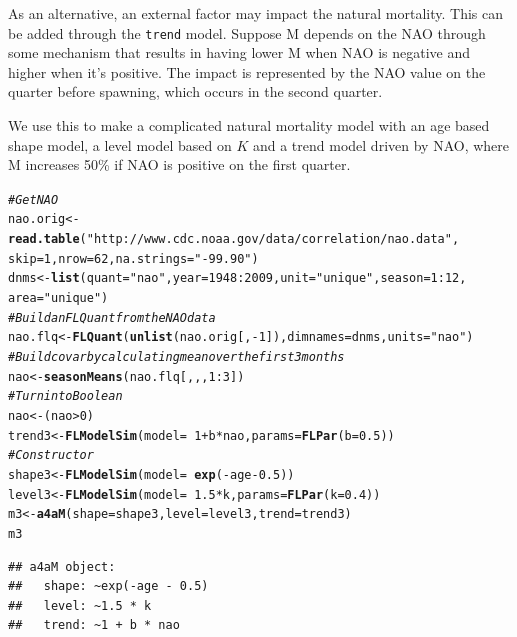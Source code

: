 \documentclass[a4paper,english,10pt]{article}\usepackage[]{graphicx}\usepackage[]{color}
\makeatletter
\newcommand{\hlnum}[1]{\textcolor[rgb]{0.686,0.059,0.569}{#1}}%
\newcommand{\hlstr}[1]{\textcolor[rgb]{0.192,0.494,0.8}{#1}}%
\newcommand{\hlcom}[1]{\textcolor[rgb]{0.678,0.584,0.686}{\textit{#1}}}%
\newcommand{\hlopt}[1]{\textcolor[rgb]{0,0,0}{#1}}%
\newcommand{\hlstd}[1]{\textcolor[rgb]{0.345,0.345,0.345}{#1}}%
\newcommand{\hlkwb}[1]{\textcolor[rgb]{0.69,0.353,0.396}{#1}}%
\newcommand{\hlkwc}[1]{\textcolor[rgb]{0.333,0.667,0.333}{#1}}%
\newcommand{\hlkwd}[1]{\textcolor[rgb]{0.737,0.353,0.396}{\textbf{#1}}}%
\newenvironment{kframe}{%
 \def\at@end@of@kframe{}%
 \ifinner\ifhmode%
  \def\at@end@of@kframe{\end{minipage}}%
  \begin{minipage}{\columnwidth}%
 \fi\fi%
 \def\FrameCommand##1{\hskip\@totalleftmargin \hskip-\fboxsep
 \colorbox{shadecolor}{##1}\hskip-\fboxsep
     \hskip-\linewidth \hskip-\@totalleftmargin \hskip\columnwidth}%
 \MakeFramed {\advance\hsize-\width
   \@totalleftmargin\z@ \linewidth\hsize
   \@setminipage}}%
 {\par\unskip\endMakeFramed%
 \at@end@of@kframe}
\newenvironment{knitrout}{}{} %
\newcommand{\code}[1]{{\texttt{#1}}}
\makeatother
\begin{document}
As an alternative, an external factor may impact the natural mortality. This can be added through the \code{trend} model. Suppose M depends on the NAO through some mechanism that results in having lower M when NAO is negative and higher when it's positive. The impact is represented by the NAO value on the quarter before spawning, which occurs in the second quarter. 

We use this to make a complicated natural mortality model with an age based shape model, a level model based on $K$ and a trend model driven by NAO, where M increases 50\% if NAO is positive on the first quarter.

\begin{knitrout}
\color{fgcolor}\begin{kframe}
\begin{alltt}
\hlcom{# Get NAO}
\hlstd{nao.orig} \hlkwb{<-} \hlkwd{read.table}\hlstd{(}\hlstr{"http://www.cdc.noaa.gov/data/correlation/nao.data"}\hlstd{,}
    \hlkwc{skip} \hlstd{=} \hlnum{1}\hlstd{,} \hlkwc{nrow} \hlstd{=} \hlnum{62}\hlstd{,} \hlkwc{na.strings} \hlstd{=} \hlstr{"-99.90"}\hlstd{)}
\hlstd{dnms} \hlkwb{<-} \hlkwd{list}\hlstd{(}\hlkwc{quant} \hlstd{=} \hlstr{"nao"}\hlstd{,} \hlkwc{year} \hlstd{=} \hlnum{1948}\hlopt{:}\hlnum{2009}\hlstd{,} \hlkwc{unit} \hlstd{=} \hlstr{"unique"}\hlstd{,} \hlkwc{season} \hlstd{=} \hlnum{1}\hlopt{:}\hlnum{12}\hlstd{,}
    \hlkwc{area} \hlstd{=} \hlstr{"unique"}\hlstd{)}
\hlcom{# Build an FLQuant from the NAO data}
\hlstd{nao.flq} \hlkwb{<-} \hlkwd{FLQuant}\hlstd{(}\hlkwd{unlist}\hlstd{(nao.orig[,} \hlopt{-}\hlnum{1}\hlstd{]),} \hlkwc{dimnames} \hlstd{= dnms,} \hlkwc{units} \hlstd{=} \hlstr{"nao"}\hlstd{)}
\hlcom{# Build covar by calculating mean over the first 3 months}
\hlstd{nao} \hlkwb{<-} \hlkwd{seasonMeans}\hlstd{(nao.flq[, , ,} \hlnum{1}\hlopt{:}\hlnum{3}\hlstd{])}
\hlcom{# Turn into Boolean}
\hlstd{nao} \hlkwb{<-} \hlstd{(nao} \hlopt{>} \hlnum{0}\hlstd{)}
\hlstd{trend3} \hlkwb{<-} \hlkwd{FLModelSim}\hlstd{(}\hlkwc{model} \hlstd{=} \hlopt{~}\hlnum{1} \hlopt{+} \hlstd{b} \hlopt{*} \hlstd{nao,} \hlkwc{params} \hlstd{=} \hlkwd{FLPar}\hlstd{(}\hlkwc{b} \hlstd{=} \hlnum{0.5}\hlstd{))}
\hlcom{# Constructor}
\hlstd{shape3} \hlkwb{<-} \hlkwd{FLModelSim}\hlstd{(}\hlkwc{model} \hlstd{=} \hlopt{~}\hlkwd{exp}\hlstd{(}\hlopt{-}\hlstd{age} \hlopt{-} \hlnum{0.5}\hlstd{))}
\hlstd{level3} \hlkwb{<-} \hlkwd{FLModelSim}\hlstd{(}\hlkwc{model} \hlstd{=} \hlopt{~}\hlnum{1.5} \hlopt{*} \hlstd{k,} \hlkwc{params} \hlstd{=} \hlkwd{FLPar}\hlstd{(}\hlkwc{k} \hlstd{=} \hlnum{0.4}\hlstd{))}
\hlstd{m3} \hlkwb{<-} \hlkwd{a4aM}\hlstd{(}\hlkwc{shape} \hlstd{= shape3,} \hlkwc{level} \hlstd{= level3,} \hlkwc{trend} \hlstd{= trend3)}
\hlstd{m3}
\end{alltt}
\begin{verbatim}
## a4aM object:
##   shape: ~exp(-age - 0.5)
##   level: ~1.5 * k
##   trend: ~1 + b * nao
\end{verbatim}
\end{kframe}
\end{knitrout}
\end{document}
